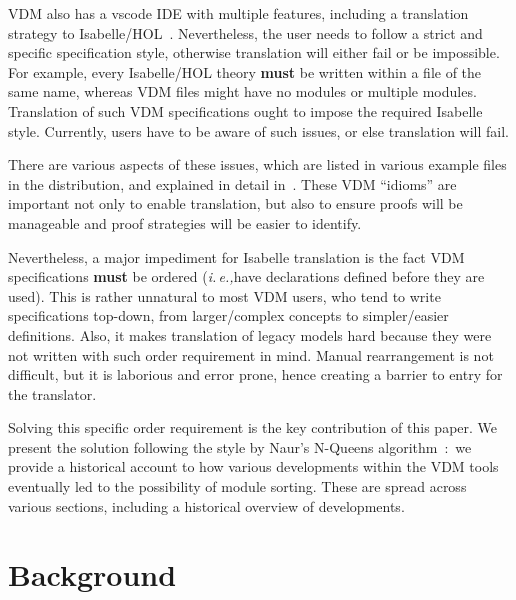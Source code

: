 \documentclass[runningheads,a4paper]{llncs}
\newcommand{\ie}{{\em i.\,e.,\/}}
\begin{document}
VDM also has a \gls{vscode} IDE with multiple features, including a translation strategy to Isabelle/HOL~\cite{AdvancedVSCodePaper}. Nevertheless, the user needs to follow a strict and specific specification style, otherwise translation will either fail or be impossible. For example, every Isabelle/HOL theory \textbf{must} be written within a file of the same name, whereas VDM files might have no modules or multiple modules. Translation of such VDM specifications ought to impose the required Isabelle style. Currently, users have to be aware of such issues, or else translation will fail.   

There are various aspects of these issues, which are listed in various example files in the distribution, and explained in detail in~\cite{NimFull}. These VDM ``idioms'' are important not only to enable translation, but also to ensure proofs will be manageable and proof strategies will be easier to identify. 

Nevertheless, a major impediment for Isabelle translation is the fact VDM specifications \textbf{must} be ordered (\ie have declarations defined before they are used). This is rather unnatural to most VDM users, who tend to write specifications top-down, from larger/complex concepts to simpler/easier definitions. Also, it makes translation of legacy models hard because they were not written with such order requirement in mind. Manual rearrangement is not difficult, but it is laborious and error prone, hence creating a barrier to entry for the translator. 

Solving this specific order requirement is the key contribution of this paper. We present the solution following the style by Naur's N-Queens algorithm~\cite{NQueens}:~we provide a historical account to how various developments within the VDM tools eventually led to the possibility of module sorting. These are spread across various sections, including a historical overview of developments.  

\section{Background}~\label{sec:background}
\end{document}
